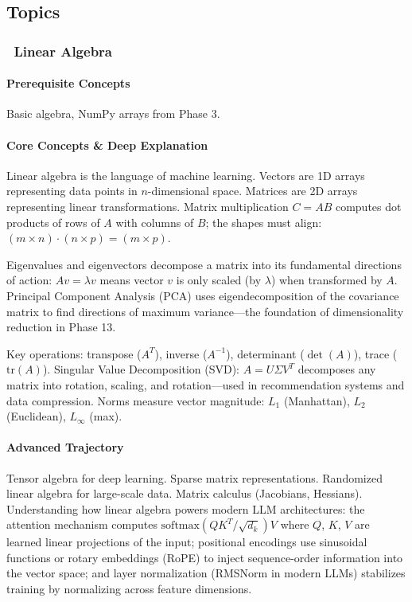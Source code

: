 \documentclass[11pt, a4paper, oneside]{report}
\newcommand{\mustmaster}[1]{\subsubsection{\texorpdfstring{\fcolorbox{blue!40!black}{blue!8}{\footnotesize\bfseries\color{blue!40!black} MUST MASTER}~#1}{#1}}}
\begin{document}
\subsection*{Topics}

\mustmaster{Linear Algebra}

\paragraph{Prerequisite Concepts} Basic algebra, NumPy arrays from Phase 3.

\paragraph{Core Concepts \& Deep Explanation} Linear algebra is the language of machine learning. Vectors are 1D arrays representing data points in $n$-dimensional space. Matrices are 2D arrays representing linear transformations. Matrix multiplication $C = AB$ computes dot products of rows of $A$ with columns of $B$; the shapes must align: $(m \times n) \cdot (n \times p) = (m \times p)$.

Eigenvalues and eigenvectors decompose a matrix into its fundamental directions of action: $Av = \lambda v$ means vector $v$ is only scaled (by $\lambda$) when transformed by $A$. Principal Component Analysis (PCA) uses eigendecomposition of the covariance matrix to find directions of maximum variance---the foundation of dimensionality reduction in Phase 13.

Key operations: transpose ($A^T$), inverse ($A^{-1}$), determinant ($\det(A)$), trace ($\text{tr}(A)$). Singular Value Decomposition (SVD): $A = U\Sigma V^T$ decomposes any matrix into rotation, scaling, and rotation---used in recommendation systems and data compression. Norms measure vector magnitude: $L_1$ (Manhattan), $L_2$ (Euclidean), $L_\infty$ (max).

\paragraph{Advanced Trajectory} Tensor algebra for deep learning. Sparse matrix representations. Randomized linear algebra for large-scale data. Matrix calculus (Jacobians, Hessians). Understanding how linear algebra powers modern LLM architectures: the attention mechanism computes $\text{softmax}(QK^T/\sqrt{d_k})V$ where $Q$, $K$, $V$ are learned linear projections of the input; positional encodings use sinusoidal functions or rotary embeddings (RoPE) to inject sequence-order information into the vector space; and layer normalization (RMSNorm in modern LLMs) stabilizes training by normalizing across feature dimensions.
\end{document}
